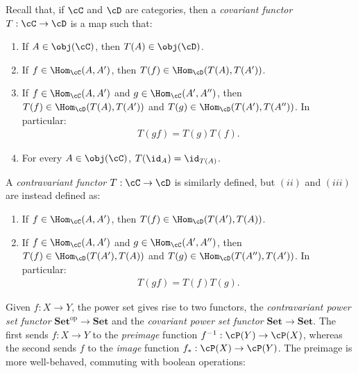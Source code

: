     \begin{example}
        Recall that, if $\cC$ and $\cD$ are categories, then a \textit{covariant functor} $T:\cC \rightarrow \cD$ is a map such that:
            \begin{enumerate}[label = (\roman*),itemsep=1pt,topsep=3pt]
                \item If $A \in \obj(\cC)$, then $T(A) \in \obj(\cD)$.
                \item If $f \in \Hom_{\cC}(A,A')$, then $T(f) \in \Hom_{\cD}(T(A),T(A'))$.
                \item If $f \in \Hom_{\cC}(A,A')$ and $g \in \Hom_{\cC}(A',A'')$, then $T(f) \in \Hom_{\cD}(T(A),T(A'))$ and $T(g) \in \Hom_{\cD}(T(A'),T(A''))$. In particular:
                    \begin{equation*}
                    \begin{split}
                        T(gf) = T(g)T(f).
                    \end{split}
                    \end{equation*}
                \item For every $A \in \obj(\cC)$, $T(\id_A) = \id_{T(A)}$.
            \end{enumerate}
        A \textit{contravariant functor} $T:\cC \rightarrow \cD$ is similarly defined, but $(ii)$ and $(iii)$ are instead defined as:
            \begin{enumerate}[label = (\roman*),itemsep=1pt,topsep=3pt]
                \addtocounter{enumi}{1}
                \item If $f \in \Hom_{\cC}(A,A')$, then $T(f) \in \Hom_{\cD}(T(A'),T(A))$.
                \item If $f \in \Hom_{\cC}(A,A')$ and $g \in \Hom_{\cC}(A',A'')$, then $T(f) \in \Hom_{\cD}(T(A'),T(A))$ and $T(g) \in \Hom_{\cD}(T(A''),T(A'))$. In particular:
                    \begin{equation*}
                    \begin{split}
                        T(gf) = T(f)T(g).
                    \end{split}
                    \end{equation*}
            \end{enumerate}
        Given $f:X \rightarrow Y$, the power set gives rise to two functors, the \textit{contravariant power set functor} $\mathbf{Set}^{\text{op}} \rightarrow \mathbf{Set}$ and the \textit{covariant power set functor} $\mathbf{Set} \rightarrow \mathbf{Set}$. The first sends $f:X \rightarrow Y$ to the \textit{preimage} function $f^{-1}:\cP(Y) \rightarrow \cP(X)$, whereas the second sends $f$ to the \textit{image} function $f_\ast:\cP(X) \rightarrow \cP(Y)$. The preimage is more well-behaved, commuting with boolean operations:

\end{example}
